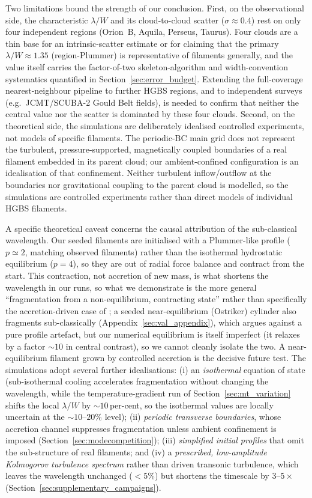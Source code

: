 \documentclass[usenatbib,twoside,twocolumn]{mnras}
\begin{document}
Two limitations bound the strength of our conclusion. First, on the observational side, the characteristic $\lambda/W$ and its cloud-to-cloud scatter ($\sigma\approx0.4$) rest on only four independent regions (Orion~B, Aquila, Perseus, Taurus). Four clouds are a thin base for an intrinsic-scatter estimate or for claiming that the primary $\lambda/W\approx1.35$ (region-Plummer) is representative of filaments generally, and the value itself carries the factor-of-two skeleton-algorithm and width-convention systematics quantified in Section~\ref{sec:error_budget}. Extending the full-coverage nearest-neighbour pipeline to further HGBS regions, and to independent surveys (e.g.\ JCMT/SCUBA-2 Gould Belt fields), is needed to confirm that neither the central value nor the scatter is dominated by these four clouds. Second, on the theoretical side, the simulations are deliberately idealised controlled experiments, not models of specific filaments. The periodic-BC main grid does not represent the turbulent, pressure-supported, magnetically coupled boundaries of a real filament embedded in its parent cloud; our ambient-confined configuration is an idealisation of that confinement. Neither turbulent inflow/outflow at the boundaries nor gravitational coupling to the parent cloud is modelled, so the simulations are controlled experiments rather than direct models of individual HGBS filaments.

A specific theoretical caveat concerns the causal attribution of the sub-classical wavelength. Our seeded filaments are initialised with a Plummer-like profile ($p\simeq2$, matching observed filaments) rather than the isothermal hydrostatic equilibrium ($p=4$), so they are out of radial force balance and contract from the start. This contraction, not accretion of new mass, is what shortens the wavelength in our runs, so what we demonstrate is the more general ``fragmentation from a non-equilibrium, contracting state'' rather than specifically the accretion-driven case of \citet{Clarke2016,Clarke2017}; a seeded near-equilibrium (Ostriker) cylinder also fragments sub-classically (Appendix~\ref{sec:val_appendix}), which argues against a pure profile artefact, but our numerical equilibrium is itself imperfect (it relaxes by a factor $\sim10$ in central contrast), so we cannot cleanly isolate the two. A near-equilibrium filament grown by controlled accretion is the decisive future test. The simulations adopt several further idealisations: (i) an \emph{isothermal} equation of state (sub-isothermal cooling accelerates fragmentation without changing the wavelength, while the temperature-gradient run of Section~\ref{sec:mt_variation} shifts the local $\lambda/W$ by $\sim10$\,per-cent, so the isothermal values are locally uncertain at the $\sim10$--$20\%$ level); (ii) \emph{periodic transverse boundaries}, whose accretion channel suppresses fragmentation unless ambient confinement is imposed (Section~\ref{sec:modecompetition}); (iii) \emph{simplified initial profiles} that omit the sub-structure of real filaments; and (iv) a \emph{prescribed, low-amplitude Kolmogorov turbulence spectrum} rather than driven transonic turbulence, which leaves the wavelength unchanged ($<5\%$) but shortens the timescale by $3$--$5\times$ (Section~\ref{sec:supplementary_campaigns}).
\end{document}

